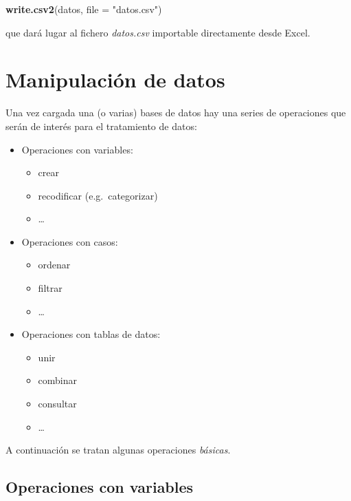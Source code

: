 \documentclass[]{book}
\newenvironment{Shaded}{\begin{snugshade}}{\end{snugshade}}
\newcommand{\KeywordTok}[1]{\textcolor[rgb]{0.13,0.29,0.53}{\textbf{#1}}}
\newcommand{\DataTypeTok}[1]{\textcolor[rgb]{0.13,0.29,0.53}{#1}}
\newcommand{\StringTok}[1]{\textcolor[rgb]{0.31,0.60,0.02}{#1}}
\newcommand{\NormalTok}[1]{#1}
\providecommand{\tightlist}{%
  \setlength{\itemsep}{0pt}\setlength{\parskip}{0pt}}
\begin{document}
\begin{Shaded}
\begin{Highlighting}[]
\KeywordTok{write.csv2}\NormalTok{(datos, }\DataTypeTok{file =} \StringTok{"datos.csv"}\NormalTok{)}
\end{Highlighting}
\end{Shaded}

que dará lugar al fichero \emph{datos.csv} importable directamente desde
Excel.

\section{Manipulación de datos}\label{manipulacion-de-datos}

Una vez cargada una (o varias) bases de datos hay una series de
operaciones que serán de interés para el tratamiento de datos:

\begin{itemize}
\tightlist
\item
  Operaciones con variables:

  \begin{itemize}
  \tightlist
  \item
    crear
  \item
    recodificar (e.g.~categorizar)
  \item
    \ldots{}
  \end{itemize}
\item
  Operaciones con casos:

  \begin{itemize}
  \tightlist
  \item
    ordenar
  \item
    filtrar
  \item
    \ldots{}
  \end{itemize}
\item
  Operaciones con tablas de datos:

  \begin{itemize}
  \tightlist
  \item
    unir
  \item
    combinar
  \item
    consultar
  \item
    \ldots{}
  \end{itemize}
\end{itemize}

A continuación se tratan algunas operaciones \emph{básicas}.

\subsection{Operaciones con variables}\label{operaciones-con-variables}
\end{document}
